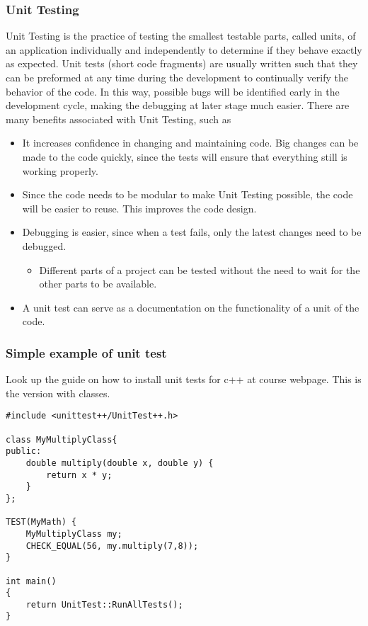 \documentclass{beamer}
\newenvironment{block_mdfboxadmon}[1][]{\begin{block}{#1}}{\end{block}}
\begin{document}
\begin{frame}
\frametitle{Unit Testing}

\begin{block_mdfboxadmon}[]
Unit Testing is the practice of testing the smallest testable parts,
called units, of an application individually and independently to
determine if they behave exactly as expected. Unit tests (short code
fragments) are usually written such that they can be preformed at any
time during the development to continually verify the behavior of the
code. In this way, possible bugs will be identified early in the
development cycle, making the debugging at later stage much
easier. There are many benefits associated with Unit Testing, such as
\begin{itemize}
  \item It increases confidence in changing and maintaining code. Big changes can be made to the code quickly, since the tests will ensure that everything still is working properly.

  \item Since the code needs to be modular to make Unit Testing possible, the code will be easier to reuse. This improves the code design.

  \item Debugging is easier, since when a test fails, only the latest changes need to be debugged.
\begin{itemize}

   \item Different parts of a project can be tested without the need to wait for the other parts to be available.

\end{itemize}

\noindent
  \item A unit test can serve as a documentation on the functionality of a unit of the code.
\end{itemize}

\noindent
\end{block_mdfboxadmon}
\end{frame}

\begin{frame}
\frametitle{Simple example of unit test}

\begin{block_mdfboxadmon}[]
Look up the guide on how to install unit tests for c++ at course webpage. This is the version with classes.
\begin{verbatim}
#include <unittest++/UnitTest++.h>

class MyMultiplyClass{
public:
    double multiply(double x, double y) {
        return x * y;
    }
};

TEST(MyMath) {
    MyMultiplyClass my;
    CHECK_EQUAL(56, my.multiply(7,8));
}

int main()
{
    return UnitTest::RunAllTests();
}
\end{verbatim}
\end{block_mdfboxadmon}
\end{frame}
\end{document}
